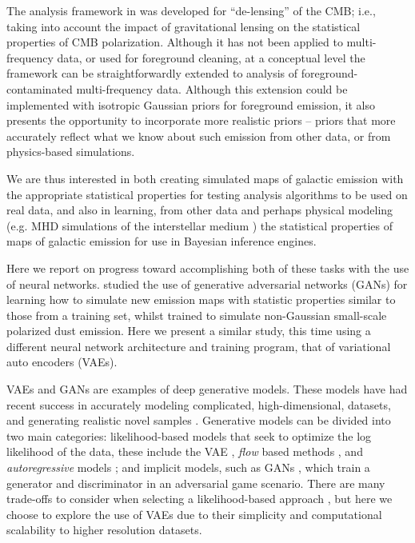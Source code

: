 \documentclass[fleqn,usenatbib]{mnras}
\begin{document}
The analysis framework in \cite{millea20a} was developed for ``de-lensing'' of the CMB; i.e., taking into account the impact of gravitational lensing on the statistical properties of CMB polarization. Although it has not been applied to multi-frequency data, or used for foreground cleaning, at a conceptual level the framework can be straightforwardly extended to analysis of foreground-contaminated multi-frequency data. Although this extension could be implemented with isotropic Gaussian priors for foreground emission, it also presents the opportunity to incorporate more realistic priors -- priors that more accurately reflect what we know about such emission from other data, or from physics-based simulations. 

We are thus interested in both creating simulated maps of galactic emission with the appropriate statistical properties for testing analysis algorithms to be used on real data, and also in learning, from other data and perhaps physical modeling (e.g. MHD simulations of the interstellar medium \citep{kim/etal:2019}) the statistical properties of maps of galactic emission for use in Bayesian inference engines.

Here we report on progress toward accomplishing both of these tasks with the use of neural networks. 
 \cite{aylor/etal:2019} studied the use of generative adversarial networks (GANs) for learning how to simulate new emission maps with statistic properties similar to those from a training set, whilst \cite{krachmalnicoff/puglisi:2020} trained to simulate non-Gaussian small-scale polarized dust emission. Here we present a similar study, this time using a different neural network architecture and training program, that of variational auto encoders (VAEs). 

VAEs and GANs are examples of deep generative models. These models have had recent success in accurately modeling complicated, high-dimensional, datasets, and generating realistic novel samples \citep{razavi/etal:2019,vandenoord/etal:2016,brock/etal:2018}. Generative models can be divided into two main categories: likelihood-based models that seek to optimize the log likelihood of the data, these include the VAE \citep{kingma/welling:2013,rezende/etal:2014}, \emph{flow} based methods \citep{dinh/etal:2014, dinh/etal:2016, rezende/etal:2015,kingma/dhariwal:2018}, and \emph{autoregressive} models \citep{vandenoord/etal:2016b}; and implicit models, such as GANs \citep{goodfellow/etal:2014}, which train a generator and discriminator in an adversarial game scenario. There are many trade-offs to consider when selecting a likelihood-based approach \citep{kingma/dhariwal:2018}, but here we choose to explore the use of VAEs due to their simplicity and computational scalability to higher resolution datasets.
\end{document}
